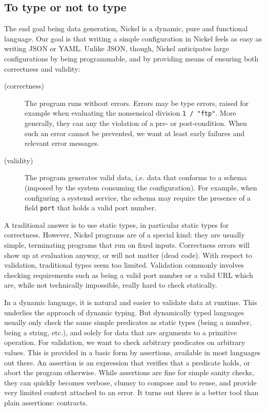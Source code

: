 \documentclass[sigplan,10pt,review,anonymous]{acmart}
\newcommand{\nickel}[1]{\lstinline[language=nickel]{#1}}
\begin{document}
\subsection*{To type or not to type}

The end goal being data generation, Nickel is a dynamic, pure and functional
language. Our goal is that writing a simple configuration in Nickel feels as
easy as writing JSON or YAML. Unlike JSON, though, Nickel anticipates large
configurations by being programmable, and by providing means of ensuring
both correctness and validity: 

\begin{description}
    \item[(correctness)] The program runs without errors. Errors may be type
        errors, raised for example when evaluating the nonsensical division
        \nickel{1 / "ftp"}. More generally, they can any the violation of a pre-
        or post-condition. When such an error cannot be prevented, we want at
        least early failures and relevant error messages.
    \item[(validity)] The program generates valid data, i.e. data that
        conforms to a schema (imposed by the system consuming the
        configuration). For example, when configuring a systemd service, the
        schema may require the presence of a field \lstinline+port+ that holds a
        valid port number.
\end{description}

A traditional answer is to use static types, in particular static types for
correctness. However, Nickel programs are of a special kind: they are usually
simple, terminating programs that run on fixed inputs. Correctness errors will
show up at evaluation anyway, or will not matter (dead code). With respect to
validation, traditional types seem too limited. Validation commonly involves
checking requirements such as being a valid port number or a valid URL which
are, while not technically impossible, really hard to check statically.

In a dynamic language, it is natural and easier to validate data at runtime.
This underlies the approach of dynamic typing. But dynamically typed languages
usually only check the same simple predicates as static types (being a number,
being a string, etc.), and solely for data that are arguments to a primitive
operation. For validation, we want to check arbitrary predicates on arbitrary
values. This is provided in a basic form by assertions, available in most
languages out there. An assertion is an expression that verifies that a
predicate holds, or abort the program otherwise.  While assertions are fine for
simple sanity checks, they can quickly becomes verbose, clumsy to compose and to
reuse, and provide very limited context attached to an error. It turns out there
is a better tool than plain assertions: contracts.
\end{document}
